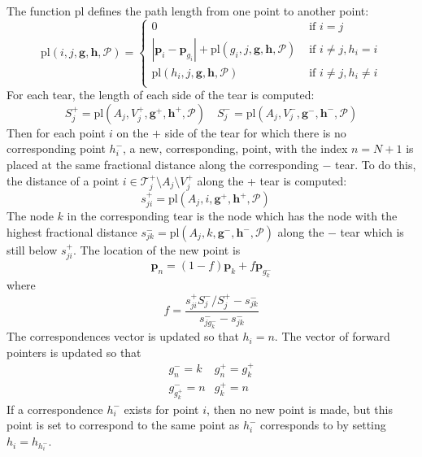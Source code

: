 \documentclass{article}
\renewcommand{\vec}[1]{\mathbf{#1}}
\begin{document}
The function $\mathrm{pl}$ defines the path length from one point to another
point:
\begin{displaymath}
  \mathrm{pl}(i, j, \vec{g}, \vec{h}, \mathcal{P}) = \left\{ 
    \begin{array}{ll}
      0 & \mbox{ if } i = j \\
      |\vec{p}_i-\vec{p}_{g_i}| + \mathrm{pl}(g_i, j, \vec{g}, \vec{h}, \mathcal{P}) & \mbox{ if } i \ne j, h_i=i \\
      \mathrm{pl}(h_i, j, \vec{g}, \vec{h}, \mathcal{P})    & \mbox{ if } i \ne j, h_i\ne i \\
    \end{array}\right.
\end{displaymath}
For each tear, the length of each side of the tear is computed:
\begin{displaymath}
  S^+_j = \mathrm{pl}(A_j, V^+_j, \vec{g}^+, \vec{h}^+, \mathcal{P}) \quad 
  S^-_j = \mathrm{pl}(A_j, V^-_j, \vec{g}^-, \vec{h}^-, \mathcal{P})
\end{displaymath}
Then for each point $i$ on the $+$ side of the tear for which there is
no corresponding point $h_i^-$, a new, corresponding, point, with the
index $n=N+1$ is placed at the same fractional distance along the
corresponding $-$ tear. To do this, the distance of a point
$i\in{\mathcal{T}^+_j}\setminus A_j \setminus V^+_j$ along the + tear
is computed:
\begin{displaymath}
  s^+_{ji} = \mathrm{pl}(A_j, i, \vec{g}^+, \vec{h}^+, \mathcal{P}) \quad 
\end{displaymath}
The node $k$ in the corresponding tear is the node which has the node
with the highest fractional distance $s^-_{jk}=\mathrm{pl}(A_j, k,
\vec{g}^-, \vec{h}^-, \mathcal{P})$ along the $-$ tear which is still below
$s^+_{ji}$. The location of the new point is
\begin{displaymath}
  \vec{p}_n = (1-f)\vec{p}_k + f\vec{p}_{g^-_k}
\end{displaymath}
where
\begin{displaymath}
  f = \frac{s^+_{ji}S^-_j/S^+_j-s^-_{jk}}{s^-_{jg^-_k}-s^-_{jk}}
\end{displaymath}
The correspondences vector is updated so that $h_i = n$. The vector of
forward pointers is updated so that
\begin{displaymath}
  \begin{array}{ll}
    g^-_n = k     & g^+_n = g^+_k \\
    g^-_{g^+_k} = n & g^+_k = n 
  \end{array}
\end{displaymath}
If a correspondence $h^-_i$ exists for point $i$, then no new point is
made, but this point is set to correspond to the same point as $h^-_i$
corresponds to by setting $h_i = h_{h^-_i}$. 
\end{document}
